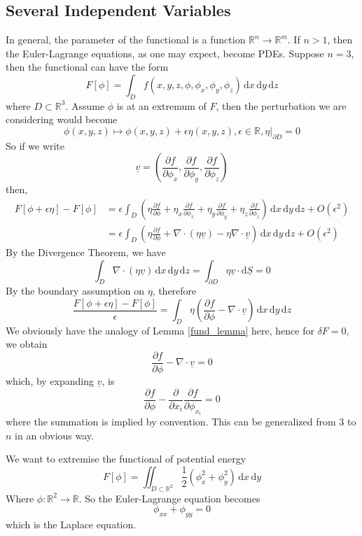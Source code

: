 \subsection{Several Independent Variables}
In general, the parameter of the functional is a function $\mathbb R^n\to\mathbb R^m$.
If $n>1$, then the Euler-Lagrange equations, as one may expect, become PDEs.
Suppose $n=3$, then the functional can have the form
$$F[\phi]=\int_Df(x,y,z,\phi,\phi_x,\phi_y,\phi_z)\,\mathrm dx\,\mathrm dy\,\mathrm dz$$
where $D\subset\mathbb R^3$.
Assume $\phi$ is at an extremum of $F$, then the perturbation we are considering would become
$$\phi(x,y,z)\mapsto \phi(x,y,z)+\epsilon \eta(x,y,z), \epsilon\in\mathbb R,\eta|_{\partial D}=0$$
So if we write
$$\underline{v}=\left( \frac{\partial f}{\partial \phi_x},\frac{\partial f}{\partial \phi_y},\frac{\partial f}{\partial\phi_z} \right)$$
then,
\begin{align*}
    F[\phi+\epsilon\eta]-F[\phi]&=\epsilon\int_D\left( \eta\frac{\partial f}{\partial\phi}+\eta_x\frac{\partial f}{\partial \phi_x}+\eta_y\frac{\partial f}{\partial \phi_y}+\eta_z\frac{\partial f}{\partial \phi_z} \right)\,\mathrm dx\,\mathrm dy\,\mathrm dz+O(\epsilon^2)\\
    &=\epsilon\int_D\left( \eta\frac{\partial f}{\partial\phi}+\nabla\cdot( \eta\underline{v})-\eta\nabla\cdot\underline{v} \right)\,\mathrm dx\,\mathrm dy\,\mathrm dz+O(\epsilon^2)
\end{align*}
By the Divergence Theorem, we have
$$\int_D\nabla\cdot(\eta\underline{v})\,\mathrm dx\,\mathrm dy\,\mathrm dz=\int_{\partial D}\eta\underline{v}\cdot\mathrm d\underline{S}=0$$
By the boundary assumption on $\eta$, therefore
$$\frac{F[\phi+\epsilon\eta]-F[\phi]}{\epsilon}=\int_D\eta\left( \frac{\partial f}{\partial\phi}-\nabla\cdot\underline{v} \right)\,\mathrm dx\,\mathrm dy\,\mathrm dz$$
We obviously have the analogy of Lemma \ref{fund_lemma} here, hence for $\delta F=0$, we obtain
$$\frac{\partial f}{\partial\phi}-\nabla\cdot\underline{v}=0$$
which, by expanding $\underline{v}$, is
$$\frac{\partial f}{\partial\phi}-\frac{\partial}{\partial x_i}\frac{\partial f}{\partial \phi_{x_i}}=0$$
where the summation is implied by convention.
This can be generalized from $3$ to $n$ in an obvious way.
\begin{example}
    We want to extremise the functional of potential energy
    $$F[\phi]=\iint_{D\subset\mathbb R^2}\frac{1}{2}(\phi_x^2+\phi_y^2)\,\mathrm dx\,\mathrm dy$$
    Where $\phi:\mathbb R^2\to\mathbb R$.
    So the Euler-Lagrange equation becomes
    $$\phi_{xx}+\phi_{yy}=0$$
    which is the Laplace equation.
\end{example}
